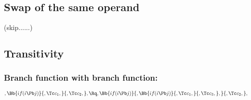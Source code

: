 \bigskip
\bigskip
\bigskip
\bigskip
\subsection{ Swap  of the same operand}
(skip......)




\bigskip
\bigskip
\bigskip
\bigskip
\subsection{Transitivity}
\subsubsection{Branch function with branch function:}
\[, \Bb{if(i \Pb j)}{,\Tc c_1,}{,\Tc c_2,}, \Rq , \Bb{if(i \Pb j)}{,\Bb{if(i \Pb j)}{,\Tc c_1,}{,\Tc c_3,},}{,\Tc c_2,},\]



